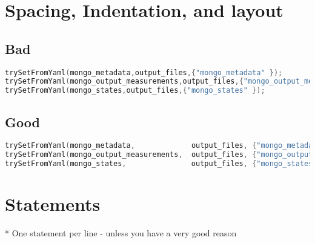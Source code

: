 \section{Spacing, Indentation, and layout}


\subsection{Bad}

\begin{lstlisting}[language=c++]
trySetFromYaml(mongo_metadata,output_files,{"mongo_metadata" });
trySetFromYaml(mongo_output_measurements,output_files,{"mongo_output_measurements" });
trySetFromYaml(mongo_states,output_files,{"mongo_states" });
\end{lstlisting}

\subsection{Good}
\begin{lstlisting}[language=c++]
trySetFromYaml(mongo_metadata,             output_files, {"mongo_metadata"              });
trySetFromYaml(mongo_output_measurements,  output_files, {"mongo_output_measurements"	});
trySetFromYaml(mongo_states,               output_files, {"mongo_states"		        });
\end{lstlisting}

\section{Statements}

* One statement per line  - \*unless you have a very good reason

